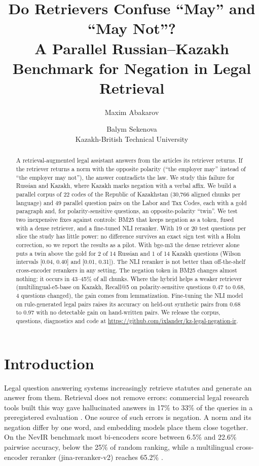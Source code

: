 \documentclass[11pt]{article}
\title{Do Retrievers Confuse ``May'' and ``May Not''?\\
A Parallel Russian--Kazakh Benchmark for Negation in Legal Retrieval}
\author{Maxim Abakarov \and Balym Sekenova \\
  Kazakh-British Technical University}
\begin{document}
\maketitle

\begin{abstract}
A retrieval-augmented legal assistant answers from the articles its retriever returns. If the retriever
returns a norm with the opposite polarity (``the employer may'' instead of ``the employer may not''), the
answer contradicts the law. We study this failure for Russian and Kazakh, where Kazakh marks negation with a
verbal affix. We build a parallel corpus of 22 codes of the Republic of Kazakhstan (30,766 aligned chunks per
language) and 49 parallel question pairs on the Labor and Tax Codes, each with a gold paragraph and, for
polarity-sensitive questions, an opposite-polarity ``twin''. We test two inexpensive fixes against controls:
BM25 that keeps negation as a token, fused with a dense retriever, and a fine-tuned NLI reranker. With
19 or 20 test questions per slice the study has little power: no difference survives an exact sign test
with a Holm correction, so we report the results as a pilot. With bge-m3 the dense retriever alone puts a
twin above the gold for 2 of 14 Russian and 1 of 14 Kazakh questions (Wilson intervals [0.04, 0.40] and
[0.01, 0.31]). The NLI reranker is not better than off-the-shelf cross-encoder rerankers in any setting.
The negation token in BM25 changes almost nothing: it occurs in 43--45\% of all chunks. Where the hybrid
helps a weaker retriever (multilingual-e5-base on Kazakh, Recall@5 on polarity-sensitive questions 0.47 to
0.68, 4 questions changed), the gain comes from lemmatization. Fine-tuning the NLI model on rule-generated
legal pairs raises its accuracy on held-out synthetic pairs from 0.68 to 0.97 with no detectable gain on
hand-written pairs. We release the corpus, questions, diagnostics and code at
\url{https://github.com/ixlander/kz-legal-negation-ir}.
\end{abstract}

\section{Introduction}

Legal question answering systems increasingly retrieve statutes and generate an answer from them.
Retrieval does not remove errors: commercial legal research tools built this way gave hallucinated answers in
17\% to 33\% of the queries in a preregistered evaluation \citep{magesh2024hallucination}. One source of such
errors is negation. A norm and its negation differ by one word, and embedding models place them close
together. On the NevIR benchmark \citep{weller-etal-2024-nevir} most bi-encoders score between 6.5\% and 22.6\% pairwise accuracy, below
the 25\% of random ranking, while a multilingual cross-encoder reranker (jina-reranker-v2) reaches 65.2\%
\citep{vandenelsen2025nevir}.
\end{document}
